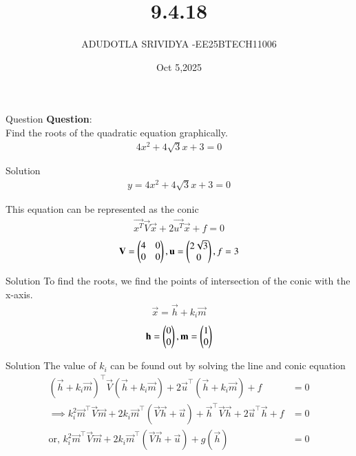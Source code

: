 \documentclass{beamer}
\begin{document}
\title 
{9.4.18}
\date{Oct 5,2025}


\author 
{ADUDOTLA SRIVIDYA -EE25BTECH11006}






\frame{\titlepage}

\begin{frame}{Question}
\textbf{Question}: \\
Find the roots of the quadratic equation graphically.
\begin{align}
4x^2 + 4\sqrt{3}x + 3 = 0
\end{align}
\end{frame}

\begin{frame}{Solution}
\begin{align}
y = 4x^2 + 4\sqrt{3}x + 3 = 0
\end{align}

This equation can be represented as the conic
\begin{align}
\vec{x^T}\vec{V}\vec{x} + 2\vec{u^T}\vec{x} + f = 0
\end{align}
\begin{align}
\mathbf{V} = \begin{pmatrix}4 & 0 \\ 0 & 0\end{pmatrix}, \mathbf{u} = \begin{pmatrix}2\sqrt{3} \\ 0\end{pmatrix}, f = 3
\end{align}
\end{frame}

\begin{frame}{Solution}
To find the roots, we find the points of intersection of the conic with the x-axis.
\begin{align}
\vec{x} = \vec{h} + k_i\vec{m}    
\end{align}
\begin{align}
\mathbf{h}=\begin{pmatrix}0 \\ 0\end{pmatrix}, \mathbf{m} = \begin{pmatrix}1 \\ 0\end{pmatrix}
\end{align}
\end{frame}

\begin{frame}{Solution}
The value of $k_i$ can be found out by solving the line and conic equation
\begin{align}
(\vec{h} + k_i \vec{m})^{\top} \vec{V} (\vec{h} + k_i \vec{m}) + 2\vec{u}^{\top} (\vec{h} + k_i \vec{m}) + f &= 0 \\
\implies k_i^{2} \vec{m}^{\top}\vec{V}\vec{m} + 2k_i \vec{m}^{\top} (\vec{V}\vec{h} + \vec{u}) + \vec{h}^{\top}\vec{V}\vec{h} + 2\vec{u}^{\top}\vec{h} + f &= 0 \\
\text{or, } k_i^{2} \vec{m}^{\top}\vec{V}\vec{m} + 2k_i \vec{m}^{\top} (\vec{V}\vec{h} + \vec{u}) + g(\vec{h}) &= 0
\end{align}
\end{frame}
\end{document}

